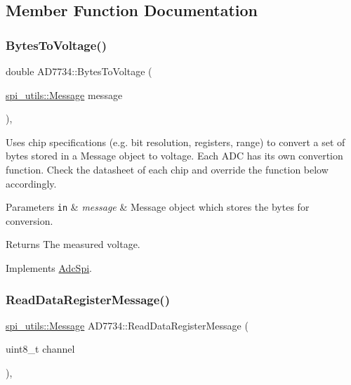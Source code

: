 \subsection{Member Function Documentation}
\mbox{\label{classAD7734_aa13b49141e69a45508998004a208afdc}} 
\subsubsection{\texorpdfstring{Bytes\+To\+Voltage()}{BytesToVoltage()}}
{\footnotesize\ttfamily double A\+D7734\+::\+Bytes\+To\+Voltage (\begin{DoxyParamCaption}\item[{\mbox{\hyperlink{structspi__utils_1_1Message}{spi\+\_\+utils\+::\+Message}}}]{message }\end{DoxyParamCaption})\hspace{0.3cm}{\ttfamily [protected]}, {\ttfamily [virtual]}}

Uses chip specifications (e.\+g. bit resolution, registers, range) to convert a set of bytes stored in a Message object to voltage. Each A\+DC has its own convertion function. Check the datasheet of each chip and override the function below accordingly. 
\begin{DoxyParams}[1]{Parameters}
\mbox{\tt in}  & {\em message} & Message object which stores the bytes for conversion. \\
\hline
\end{DoxyParams}
\begin{DoxyReturn}{Returns}
The measured voltage. 
\end{DoxyReturn}


Implements \mbox{\hyperlink{classAdcSpi_a25a1deb55a9f0e71a405ca47a41f3804}{Adc\+Spi}}.

\mbox{\label{classAD7734_a6fa5e7c2bd8cde50dccb328d36f12516}} 
\subsubsection{\texorpdfstring{Read\+Data\+Register\+Message()}{ReadDataRegisterMessage()}}
{\footnotesize\ttfamily \mbox{\hyperlink{structspi__utils_1_1Message}{spi\+\_\+utils\+::\+Message}} A\+D7734\+::\+Read\+Data\+Register\+Message (\begin{DoxyParamCaption}\item[{uint8\+\_\+t}]{channel }\end{DoxyParamCaption})\hspace{0.3cm}{\ttfamily [protected]}, {\ttfamily [virtual]}}


